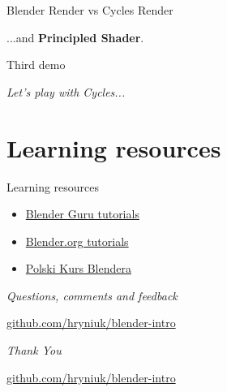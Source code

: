 \documentclass{beamer}
\begin{document}
\begin{frame}{Blender Render vs Cycles Render}

\centering \Huge
...and \textbf{Principled Shader}.

\end{frame}

\begin{frame}{Third demo}

\centering \Huge
\emph{Let's play with Cycles...}

\end{frame}

\section{Learning resources}

\begin{frame}{Learning resources}

\begin{itemize}
\item \href{https://www.blenderguru.com/}{Blender Guru tutorials}
\item \href{https://www.blender.org/support/tutorials/}{Blender.org tutorials}
\item \href{http://polskikursblendera.pl/}{Polski Kurs Blendera}
\end{itemize}

\end{frame}

\begin{frame}{}
  \centering \Huge
  \emph{Questions, comments and feedback}
  
  \centering \Large 
  \href{https://github.com/hryniuk/blender-intro}{github.com/hryniuk/blender-intro}
\end{frame}

\begin{frame}{}
  \centering \Huge
  \emph{Thank You}
  
  \centering \Large
  \href{https://github.com/hryniuk/blender-intro}{github.com/hryniuk/blender-intro}
\end{frame}
\end{document}
